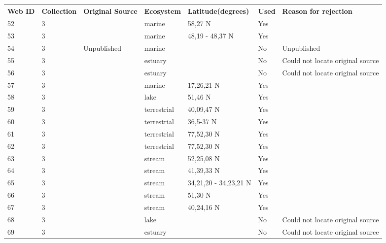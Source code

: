 \documentclass[12pt]{article}
\begin{document}
\begin{landscape}
    \begin{table}[h!]
    \centering
    {\footnotesize
      \begin{tabular}{p{2.8cm}p{1.3cm}p{3cm}p{2.2cm}p{2.5cm}lp{8.2cm}}
        \hline
        Web ID & Collection & Original Source & Ecosystem & Latitude(degrees) & Used  & Reason for rejection  \\
        \hline
        52    & 3 & \cite{Paine1980a}    & marine & 58,27 N & Yes   &       \\
        53    & 3 & \cite{Paine1980a}    & marine & 48,19 - 48,37 N & Yes   &       \\
        54    & 3 & Unpublished  & marine &       & No    & Unpublished \\
        55    & 3 & \cite{Milne1972}  & estuary &       & No    & Could not locate original source \\
        56    & 3 & \cite{Milne1972}  & estuary &       & No    & Could not locate original source \\
        57    & 3 & \cite{Yanez1978}  & marine & 17,26,21 N & Yes   &       \\
        58    & 3 & \cite{Smirnov1961}  & lake & 51,46 N & Yes   &       \\
        59    & 3 & \cite{Twomey1945}    & terrestrial & 40,09,47 N & Yes   &       \\
        60    & 3 & \cite{Rasmussen1941}    & terrestrial & 36,5-37 N & Yes   &       \\
        61    & 3 & \cite{Summerhayes1928}  & terrestrial & 77,52,30 N & Yes   &       \\
        62    & 3 & \cite{Summerhayes1928}  & terrestrial & 77,52,30 N & Yes   &       \\
        63    & 3 & \cite{Jones1950}     & stream & 52,25,08 N & Yes   &       \\
        64    & 3 & \cite{Cummins1966}    & stream & 41,39,33 N & Yes   &       \\
        65    & 3 & \cite{Tsuda1972}  & stream & 34,21,20 - 34,23,21 N & Yes   &       \\
        66    & 3 & \cite{Mann1972a}  & stream & 51,30 N & Yes   &       \\
        67    & 3 & \cite{Carlson1968}    & stream & 40,24,16 N & Yes   &       \\
        68    & 3 & \cite{Morgan1972}  & lake &       & No    & Could not locate original source \\
        69    & 3 & \cite{Cohen1990}  & estuary &       & No    & Could not locate original source \\

\end{tabular}}
\end{table}
\end{landscape}
\end{document}
